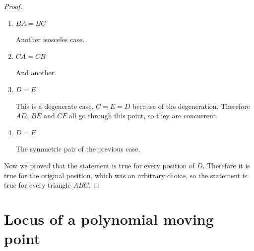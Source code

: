 \documentclass[a4paper]{article}
\begin{document}
\begin{proof}
\begin{enumerate}
        \item $BA=BC$

        Another isosceles case.
        \item $CA=CB$

        And another.
        \item $D=E$

        This is a degenerate case. $C=E=D$ because of the degeneration. Therefore $AD$, $BE$ and $CF$ all go through this point, so they are concurrent.

        \item $D=F$

        The symmetric pair of the previous case.
    \end{enumerate}
    Now we proved that the statement is true for every position of $D$. Therefore it is true for the original position, which was an arbitrary choice, so the statement is true for every triangle $ABC$.
\end{proof}






\section{Locus of a polynomial moving point}
\end{document}
